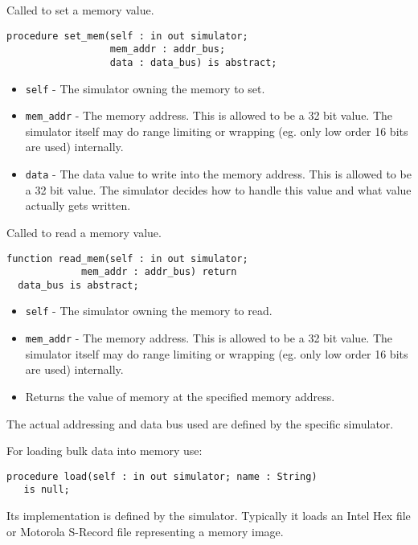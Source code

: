 \documentclass[10pt, openany]{book}
\newcommand{\keyword}[1]{\texttt{#1}}
\begin{document}
Called to set a memory value.
\begin{lstlisting}
procedure set_mem(self : in out simulator;
                  mem_addr : addr_bus;
                  data : data_bus) is abstract;
\end{lstlisting}
\begin{itemize}
  \item \keyword{self} - The simulator owning the memory to set.
  \item \keyword{mem\_addr} - The memory address.  This is allowed to be a 32 bit value.  The simulator itself may do range limiting or wrapping (eg. only low order 16 bits are used) internally.
  \item \keyword{data} - The data value to write into the memory address.  This is allowed to be a 32 bit value.  The simulator decides how to handle this value and what value actually gets written.
\end{itemize}
Called to read a memory value.
\begin{lstlisting}
function read_mem(self : in out simulator;
             mem_addr : addr_bus) return
  data_bus is abstract;
\end{lstlisting}
\begin{itemize}
  \item \keyword{self} - The simulator owning the memory to read.
  \item \keyword{mem\_addr} - The memory address.  This is allowed to be a 32 bit value.  The simulator itself may do range limiting or wrapping (eg. only low order 16 bits are used) internally.
  \item Returns the value of memory at the specified memory address.
\end{itemize}
The actual addressing and data bus used are defined by the specific simulator.

For loading bulk data into memory use:
\begin{lstlisting}
procedure load(self : in out simulator; name : String)
   is null;
\end{lstlisting}
Its implementation is defined by the simulator.  Typically it loads an Intel Hex file or Motorola S-Record file representing a memory image.
\end{document}
